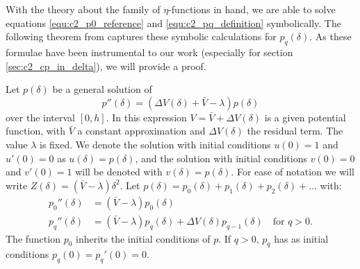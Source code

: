 With the theory about the family of $\eta$-functions in hand, we are able to solve equations \eqref{equ:c2_p0_reference} and \eqref{equ:c2_pq_definition} symbolically. The following theorem from \cite{ixaru_numerical_1984} captures these symbolic calculations for $p_q(\delta)$. As these formulae have been instrumental to our work (especially for section \ref{sec:c2_cp_in_delta}), we will provide a proof.

\begin{theorem}[Ixaru 1984]\label{the:c2_perturbation_terms}
    Let $p(\delta)$ be a general solution of
    $$
        p''(\delta) = \left(\Delta V(\delta) + \bar{V} - \lambda\right)p(\delta)
    $$
    over the interval $[0, h]$. In this expression $V = \bar{V} + \Delta V(\delta)$ is a given potential function, with $\bar{V}$ a constant approximation and $\Delta V(\delta)$ the residual term. The value $\lambda$ is fixed. We denote the solution with initial conditions $u(0) = 1$ and $u'(0)=0$ as $u(\delta) = p(\delta)$, and the solution with initial conditions $v(0) = 0$ and $v'(0) = 1$ will be denoted with $v(\delta) = p(\delta)$. For ease of notation we will write $Z(\delta) = \left(\bar{V} - \lambda\right)\delta^2$. Let $p(\delta) = p_0(\delta) + p_1(\delta) + p_2(\delta) + \dots$ with:
    \begin{align*}
        p_0''(\delta) & = (\bar{V} - \lambda) p_0(\delta)                                                             \\
        p_q''(\delta) & = (\bar{V} - \lambda) p_q(\delta) + \Delta V(\delta) p_{q-1}(\delta) \quad\text{for $q > 0$.}
    \end{align*}
    The function $p_0$ inherits the initial conditions of $p$. If $q > 0$, $p_q$ has as initial conditions $p_q(0) = p_q'(0) = 0$.



\end{theorem}
